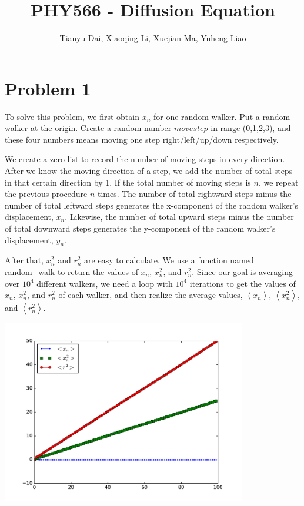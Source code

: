 \documentclass{article}
\author{Tianyu Dai, Xiaoqing Li, Xuejian Ma, Yuheng Liao }
\title{PHY566 - Diffusion Equation}
\begin{document}
\date{}
\maketitle
\section{Problem 1}
\quad To solve this problem, we first obtain $x_{n}$ for one random walker. Put a
random walker at the origin. Create a random number $movestep$ in range
(0,1,2,3), and these four numbers means moving one step right/left/up/down
respectively.

We create a zero list to record the number of moving steps in every
direction. After we know the moving direction of a step, we add the number of
total steps in that certain direction by 1. If the total number of moving
steps is $n$, we repeat the previous procedure $n$ times. The number of
total rightward steps minus the number of total leftward steps generates the
x-component of the random walker's displacement, $x_{n}$. Likewise, the
number of total upward steps minus the number of total downward steps
generates the y-component of the random walker's displacement, $y_{n}$.

After that, $x_{n}^{2}$ and $r_{n}^{2}$ are easy to calculate. We use a
function named random\_walk to return the values of $x_{n}$,  $x_{n}^{2}$,
and $r_{n}^{2}$. Since our goal is averaging over $10^{4}$ different
walkers, we need a loop with $10^{4}$ iterations to get the values of $%
x_{n}$, $x_{n}^{2}$, and $r_{n}^{2}$ of each walker, and then realize the
average values, $\left\langle x_{n}\right\rangle $, $\left\langle
x_{n}^{2}\right\rangle $, and $\left\langle r_{n}^{2}\right\rangle $.
\begin{center}
  \includegraphics[width=0.8\textwidth]{./RandomWalk.pdf}
\end{center}
\end{document}
